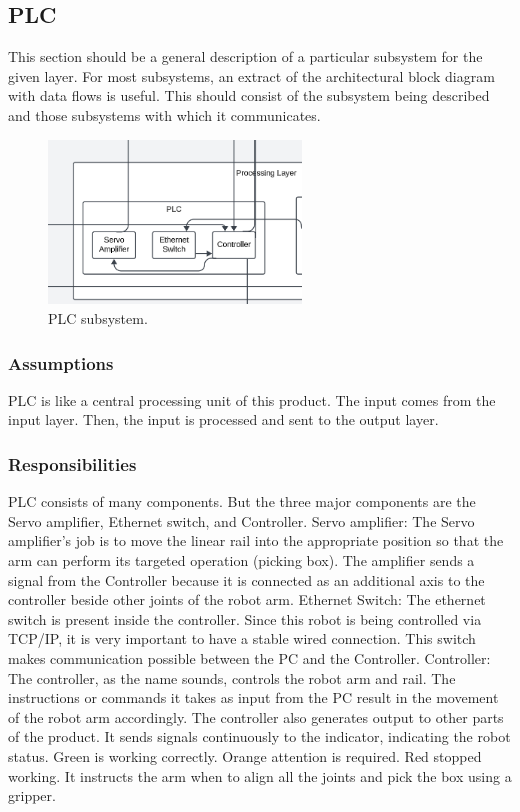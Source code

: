 \subsection{PLC}
This section should be a general description of a particular subsystem for the given layer. For most subsystems, an extract of the architectural block diagram with data flows is useful. This should consist of the subsystem being described and those subsystems with which it communicates.

\begin{figure}[h!]
	\centering
 	\includegraphics[width=0.60\textwidth]{images/PLC.png}
 \caption{PLC subsystem.}
\end{figure}

\subsubsection{Assumptions}
PLC is like a central processing unit of this product. The input comes from the input layer. Then, the input is processed and sent to the output layer. 

\subsubsection{Responsibilities}
PLC consists of many components. But the three major components are the Servo amplifier, Ethernet switch, and Controller. 
Servo amplifier: The Servo amplifier's job is to move the linear rail into the appropriate position so that the arm can perform its targeted operation (picking box). The amplifier sends a signal from the Controller because it is connected as an additional axis to the controller beside other joints of the robot arm.
Ethernet Switch: The ethernet switch is present inside the controller. Since this robot is being controlled via TCP/IP, it is very important to have a stable wired connection. This switch makes communication possible between the PC and the Controller.
Controller: The controller, as the name sounds, controls the robot arm and rail. The instructions or commands it takes as input from the PC result in the movement of the robot arm accordingly. The controller also generates output to other parts of the product. It sends signals continuously to the indicator, indicating the robot status. Green is working correctly. Orange attention is required. Red stopped working. It instructs the arm when to align all the joints and pick the box using a gripper. 

